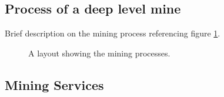 	\subsection{Process of a deep level mine}
	Brief description on the mining process referencing figure \ref{fig: Mining Layout}.
		\begin{figure}[h!]
			\centering
			\caption{A layout showing the mining processes.}
			\label{fig: Mining Layout}
		\end{figure}
	\subsection{Mining Services}

